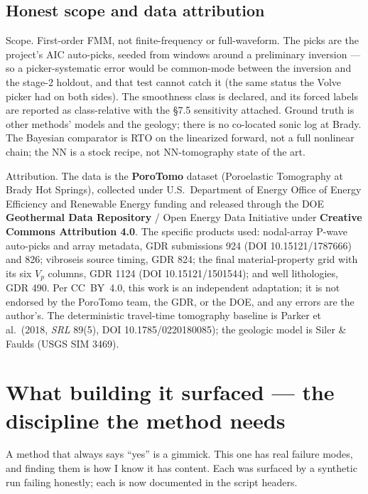 \documentclass[11pt]{article}
\begin{document}
\subsection{Honest scope and data attribution}
\label{sec:porotomo-licence}

Scope. First-order FMM, not finite-frequency or full-waveform. The picks
are the project's AIC auto-picks, seeded from windows around a preliminary
inversion --- so a picker-systematic error would be common-mode between
the inversion and the stage-2 holdout, and that test cannot catch it (the
same status the Volve picker had on both sides). The smoothness class is
declared, and its forced labels are reported as class-relative with the
\S7.5 sensitivity attached. Ground truth is other methods' models and the
geology; there is no co-located sonic log at Brady. The Bayesian
comparator is RTO on the linearized forward, not a full nonlinear chain;
the NN is a stock recipe, not NN-tomography state of the art.

Attribution. The data is the \textbf{PoroTomo} dataset (Poroelastic
Tomography at Brady Hot Springs), collected under U.S.\ Department of
Energy Office of Energy Efficiency and Renewable Energy funding and
released through the DOE \textbf{Geothermal Data Repository} / Open Energy
Data Initiative under \textbf{Creative Commons Attribution 4.0}. The
specific products used: nodal-array P-wave auto-picks and array metadata,
GDR submissions 924 (DOI 10.15121/1787666) and 826; vibroseis source
timing, GDR 824; the final material-property grid with its six $V_p$
columns, GDR 1124 (DOI 10.15121/1501544); and well lithologies, GDR 490.
Per CC~BY~4.0, this work is an independent adaptation; it is not endorsed
by the PoroTomo team, the GDR, or the DOE, and any errors are the
author's. The deterministic travel-time tomography baseline is Parker et
al.\ (2018, \emph{SRL} 89(5), DOI 10.1785/0220180085); the geologic model
is Siler \& Faulds (USGS SIM 3469).

\section{What building it surfaced --- the discipline the method needs}

A method that always says ``yes'' is a gimmick. This one has real failure
modes, and finding them is how I know it has content. Each was surfaced by a
synthetic run failing honestly; each is now documented in the script headers.
\end{document}
